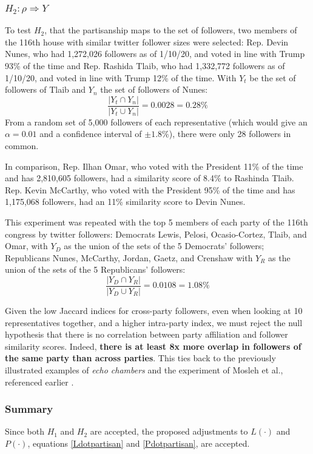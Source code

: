 \documentclass[preprint,review,12pt]{elsarticle}
\begin{document}
\subsubsection{$H_2: \rho \Rightarrow Y$}
\label{$H_2: \rho \Rightarrow Y$}
To test $H_2$, that the partisanship maps to the set of followers, two members of the 116th house with similar twitter follower sizes were selected: Rep. Devin Nunes, who had 1,272,026 followers as of 1/10/20, and voted in line with Trump 93\% of the time and Rep. Rashida Tlaib, who had 1,332,772 followers as of 1/10/20, and voted in line with Trump 12\% of the time. With $Y_t$ be the set of followers of Tlaib and $Y_n$ the set of followers of Nunes: 
\begin{equation}
\frac{|Y_t \cap Y_n|}{|Y_t \cup Y_n|} = 0.0028 = 0.28\%
\end{equation}
From a random set of 5,000 followers of each representative (which would give an $\alpha = 0.01$ and a confidence interval of $\pm 1.8\%$), there were only 28 followers in common.

In comparison, Rep. Ilhan Omar, who voted with the President 11\% of the time and has 2,810,605 followers, had a similarity score of 8.4\% to Rashinda Tlaib. Rep. Kevin McCarthy, who voted with the President 95\% of the time and has 1,175,068 followers, had an 11\% similarity score to Devin Nunes.

This experiment was repeated with the top 5 members of each party of the 116th congress by twitter followers: Democrats Lewis, Pelosi, Ocasio-Cortez, Tlaib, and Omar, with $Y_D$ as the union of the sets of the 5 Democrats' followers; Republicans Nunes, McCarthy, Jordan, Gaetz, and Crenshaw with $Y_R$ as the union of the sets of the 5 Republicans' followers:
\begin{equation}
\label{party overlap twitter}
    \frac{|Y_D \cap Y_R|}{|Y_D \cup Y_R|} = 0.0108 = 1.08\%
\end{equation}

Given the low Jaccard indices for cross-party followers, even when looking at 10 representatives together, and a higher intra-party index, we must reject the null hypothesis that there is no correlation between party affiliation and follower similarity scores. Indeed, \textbf{there is at least 8x more overlap in followers of the same party than across parties}. This ties back to the previously illustrated examples of \textit{echo chambers} and the experiment of Mosleh et al., referenced earlier \cite{mosleh2020shared}.

\subsubsection{Summary}
\label{sec: P dot summary}
Since both $H_1$ and $H_2$ are accepted, the proposed adjustments to $L(\cdot)$ and $P(\cdot)$, equations \ref{Ldotpartisan} and \ref{Pdotpartisan}, are accepted.
\end{document}
